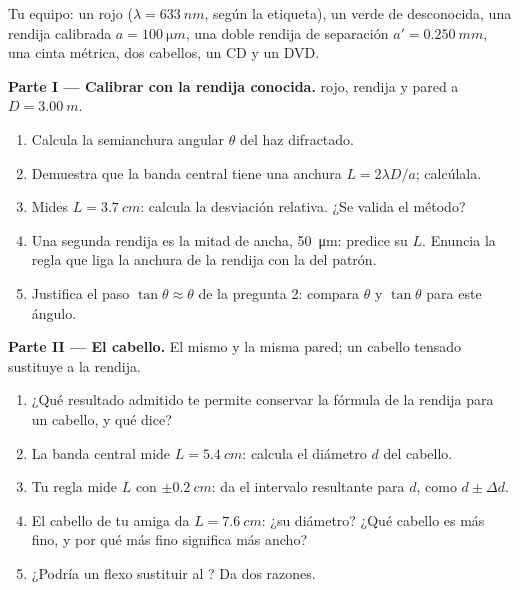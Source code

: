 \begin{problem}
\label{pb:g12:light-as-wave:1}
Tu equipo: un  rojo ($\lambda = \qty{633}{nm}$, según la etiqueta),
un  verde de  desconocida, una rendija calibrada
$a = \qty{100}{\micro m}$, una doble rendija de separación
$a' = \qty{0.250}{mm}$, una cinta métrica, dos cabellos, un CD y un
DVD.

\medskip
\noindent\textbf{Parte I --- Calibrar con la rendija conocida.}
 rojo, rendija y pared a $D = \qty{3.00}{m}$.
\begin{enumerate}
  \item Calcula la semianchura angular $\theta$ del haz difractado.
  \item Demuestra que la banda central tiene una anchura
        $L = 2\lambda D/a$; calcúlala.
  \item Mides $L = \qty{3.7}{cm}$: calcula la desviación relativa. ¿Se
        valida el método?
  \item Una segunda rendija es la mitad de ancha, \qty{50}{\micro m}:
        predice su $L$. Enuncia la regla que liga la anchura de la
        rendija con la del patrón.
  \item Justifica el paso $\tan\theta \approx \theta$ de la pregunta 2:
        compara $\theta$ y $\tan\theta$ para este ángulo.
\end{enumerate}

\medskip
\noindent\textbf{Parte II --- El cabello.} El mismo  y la misma
pared; un cabello tensado sustituye a la rendija.
\begin{enumerate}[resume]
  \item ¿Qué resultado admitido te permite conservar la fórmula de la
        rendija para un cabello, y qué dice?
  \item La banda central mide $L = \qty{5.4}{cm}$: calcula el diámetro
        $d$ del cabello.
  \item Tu regla mide $L$ con $\pm\qty{0.2}{cm}$: da el intervalo
        resultante para $d$, como $d \pm \Delta d$.
  \item El cabello de tu amiga da $L = \qty{7.6}{cm}$: ¿su diámetro?
        ¿Qué cabello es más fino, y por qué más fino significa más
        ancho?
  \item ¿Podría un flexo sustituir al ? Da dos razones.
\end{enumerate}


\end{problem}
